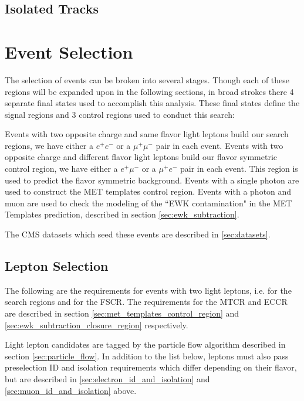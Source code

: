   \subsection{Isolated Tracks} \label{sec:isolated_tracks}

\section{Event Selection}

  The selection of events can be broken into several stages. Though each of these regions will be expanded upon in the following sections, in broad strokes there 4 separate final states used to accomplish this analysis. These final states define the signal regions and 3 control regions used to conduct this search:

  \begin{description}
     Events with two opposite charge and same flavor light leptons build our search regions, we have either a $e^+e^-$ or a $\mu^+ \mu^-$ pair in each event.
     Events with two opposite charge and different flavor light leptons build our flavor symmetric control region, we have either a $e^+\mu^-$ or a $\mu^+ e^-$ pair in each event. This region is used to predict the flavor symmetric background.
     Events with a single photon are used to construct the MET templates control region. 
     Events with a photon and muon are used to check the modeling of the ``EWK contamination" in the MET Templates prediction, described in section \ref{sec:ewk_subtraction}.
  \end{description}

  The CMS datasets which seed these events are described in \ref{sec:datasets}.
  
  \subsection{Lepton Selection}
    The following are the requirements for events with two light leptons, i.e. for the search regions and for the FSCR. The requirements for the MTCR and ECCR are described in section \ref{sec:met_templates_control_region} and \ref{sec:ewk_subtraction_closure_region} respectively. 

    Light lepton candidates are tagged by the particle flow algorithm described in section \ref{sec:particle_flow}. In addition to the list below, leptons must also pass preselection ID and isolation requirements which differ depending on their flavor, but are described in \ref{sec:electron_id_and_isolation} and \ref{sec:muon_id_and_isolation} above.


